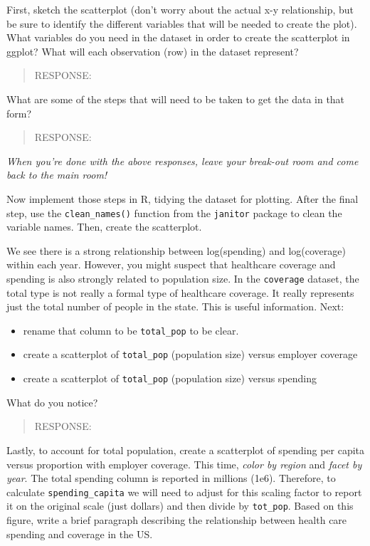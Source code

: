 \documentclass[
]{article}
\providecommand{\tightlist}{%
  \setlength{\itemsep}{0pt}\setlength{\parskip}{0pt}}
\begin{document}
First, sketch the scatterplot (don't worry about the actual x-y
relationship, but be sure to identify the different variables that will
be needed to create the plot). What variables do you need in the dataset
in order to create the scatterplot in ggplot? What will each observation
(row) in the dataset represent?

\begin{quote}
RESPONSE:
\end{quote}

What are some of the steps that will need to be taken to get the data in
that form?

\begin{quote}
RESPONSE:
\end{quote}

\emph{When you're done with the above responses, leave your break-out
room and come back to the main room!}

Now implement those steps in R, tidying the dataset for plotting. After
the final step, use the \texttt{clean\_names()} function from the
\texttt{janitor} package to clean the variable names. Then, create the
scatterplot.

We see there is a strong relationship between log(spending) and
log(coverage) within each year. However, you might suspect that
healthcare coverage and spending is also strongly related to population
size. In the \texttt{coverage} dataset, the total type is not really a
formal type of healthcare coverage. It really represents just the total
number of people in the state. This is useful information. Next:

\begin{itemize}
\tightlist
\item
  rename that column to be \texttt{total\_pop} to be clear.
\item
  create a scatterplot of \texttt{total\_pop} (population size) versus
  employer coverage
\item
  create a scatterplot of \texttt{total\_pop} (population size) versus
  spending
\end{itemize}

What do you notice?

\begin{quote}
RESPONSE:
\end{quote}

Lastly, to account for total population, create a scatterplot of
spending per capita versus proportion with employer coverage. This time,
\emph{color by region} and \emph{facet by year}. The total spending
column is reported in millions (1e6). Therefore, to calculate
\texttt{spending\_capita} we will need to adjust for this scaling factor
to report it on the original scale (just dollars) and then divide by
\texttt{tot\_pop}. Based on this figure, write a brief paragraph
describing the relationship between health care spending and coverage in
the US.
\end{document}
